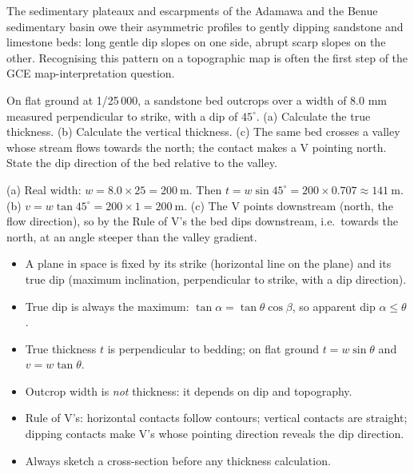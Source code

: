 \documentclass[11pt]{article}
\newcommand{\cle}[1]{{\popxbold\color{popdark}#1}}
\begin{document}
\begin{savaistu}
The sedimentary plateaux and escarpments of the Adamawa and the Benue sedimentary basin owe their asymmetric profiles to gently dipping sandstone and limestone beds: long gentle dip slopes on one side, abrupt scarp slopes on the other. Recognising this pattern on a topographic map is often the first step of the GCE map-interpretation question.
\end{savaistu}

\begin{exercice}
On flat ground at 1/25\,000, a sandstone bed outcrops over a width of 8.0 mm measured perpendicular to strike, with a dip of $45^{\circ}$. (a) Calculate the true thickness. (b) Calculate the vertical thickness. (c) The same bed crosses a valley whose stream flows towards the north; the contact makes a V pointing north. State the dip direction of the bed relative to the valley.
\end{exercice}

\begin{corrige}[Exercise 1]
(a) Real width: $w = 8.0 \times 25 = 200\ \mathrm{m}$. Then $t = w\sin 45^{\circ} = 200 \times 0.707 \approx 141\ \mathrm{m}$.
(b) $v = w\tan 45^{\circ} = 200 \times 1 = 200\ \mathrm{m}$.
(c) The V points downstream (north, the flow direction), so by the Rule of V's the bed dips downstream, i.e.\ towards the north, at an angle steeper than the valley gradient.
\end{corrige}

\begin{aretenir}
\begin{itemize}
\item A plane in space is fixed by its \cle{strike} (horizontal line on the plane) and its \cle{true dip} (maximum inclination, perpendicular to strike, with a dip direction).
\item True dip is always the maximum: $\tan\alpha = \tan\theta\cos\beta$, so apparent dip $\alpha \le \theta$.
\item \cle{True thickness} $t$ is perpendicular to bedding; on flat ground $t = w\sin\theta$ and $v = w\tan\theta$.
\item Outcrop width is \emph{not} thickness: it depends on dip and topography.
\item Rule of V's: horizontal contacts follow contours; vertical contacts are straight; dipping contacts make V's whose pointing direction reveals the dip direction.
\item Always sketch a cross-section before any thickness calculation.
\end{itemize}
\end{aretenir}
\end{document}

